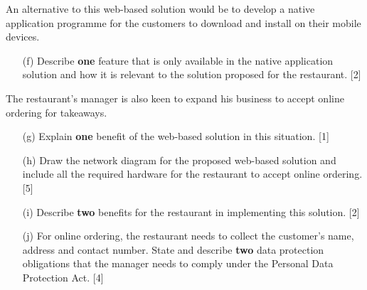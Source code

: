 An alternative to this web-based solution would be to develop a native
application programme for the customers to download and install on
their mobile devices. 
\begin{enumerate}
\item[(f)]  Describe \textbf{one} feature that is only available in the native
application solution and how it is relevant to the solution proposed
for the restaurant. \hfill{}{[}2{]}
\end{enumerate}
The restaurant\textquoteright s manager is also keen to expand his
business to accept online ordering for takeaways. 
\begin{enumerate}
\item[(g)]  Explain \textbf{one} benefit of the web-based solution in this situation.\hfill{}
{[}1{]}
\item[(h)]  Draw the network diagram for the proposed web-based solution and
include all the required hardware for the restaurant to accept online
ordering.\hfill{} {[}5{]}
\item[(i)]  Describe \textbf{two} benefits for the restaurant in implementing
this solution. \hfill{}{[}2{]}
\item[(j)]  For online ordering, the restaurant needs to collect the customer's
name, address and contact number. State and describe \textbf{two}
data protection obligations that the manager needs to comply under
the Personal Data Protection Act. \hfill{}{[}4{]}
\end{enumerate}